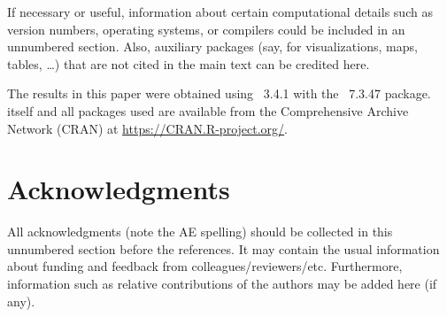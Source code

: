 \documentclass[article]{jss}\usepackage[]{graphicx}\usepackage[]{color}
\begin{document}
\begin{leftbar}
If necessary or useful, information about certain computational details
such as version numbers, operating systems, or compilers could be included
in an unnumbered section. Also, auxiliary packages (say, for visualizations,
maps, tables, \dots) that are not cited in the main text can be credited here.
\end{leftbar}

The results in this paper were obtained using
~3.4.1 with the
~7.3.47 package.  itself
and all packages used are available from the Comprehensive
 Archive Network (CRAN) at
\url{https://CRAN.R-project.org/}.


\section*{Acknowledgments}

\begin{leftbar}
All acknowledgments (note the AE spelling) should be collected in this
unnumbered section before the references. It may contain the usual information
about funding and feedback from colleagues/reviewers/etc. Furthermore,
information such as relative contributions of the authors may be added here
(if any).
\end{leftbar}







\newpage
\end{document}
